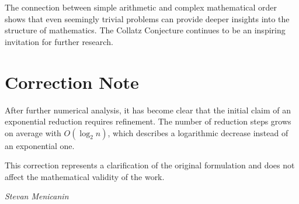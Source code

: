 \documentclass[a4paper,12pt]{article}
\begin{document}
The connection between simple arithmetic and complex mathematical order shows that even seemingly trivial problems can provide deeper insights into the structure of mathematics. The Collatz Conjecture continues to be an inspiring invitation for further research.

\section*{Correction Note}

After further numerical analysis, it has become clear that the initial claim of an exponential reduction requires refinement. The number of reduction steps grows on average with \( O(\log_2 n) \), which describes a logarithmic decrease instead of an exponential one. 

This correction represents a clarification of the original formulation and does not affect the mathematical validity of the work.


\vspace{1cm}
\begin{flushright}
\textit{Stevan Menicanin}
\end{flushright}
\end{document}
